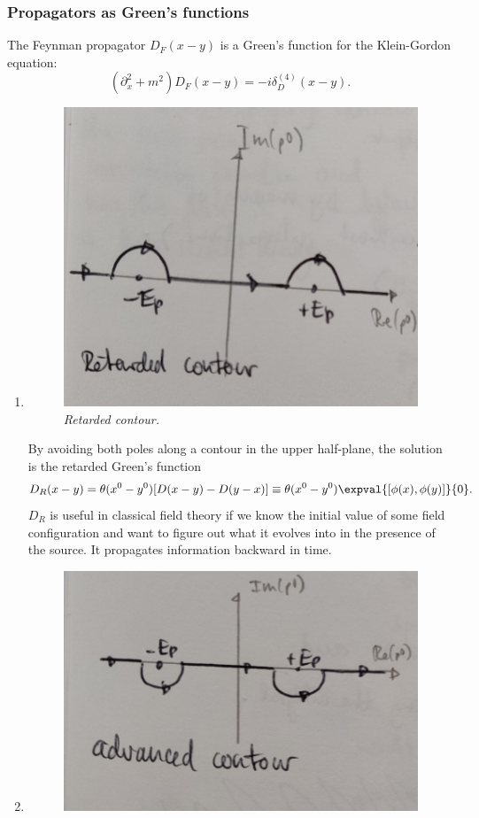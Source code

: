 \subsubsection{Propagators as Green's functions}
The Feynman propagator $D_F(x-y)$ is a Green's function for the Klein-Gordon equation:
\begin{equation}
	(\partial^2_x + m^2) D_F(x-y) = -i \delta^{(4)}_D(x-y).
\end{equation}
\begin{enumerate}
		\item
		\begin{figure}[h]
			\centering
			\includegraphics[width=0.7\linewidth]{gfx/Retardedcontour}
			\caption{\itshape Retarded contour.}
			\label{fig:retardedcontour}
		\end{figure} 
	 By avoiding both poles along a contour in the upper half-plane, the solution is the retarded Green's function
		\begin{equation}
			D_R(x-y)=\theta(x^0-y^0) [D(x-y)-D(y-x)]\equiv \theta(x^0-y^0) \expval{[\phi(x),\phi(y)]}{0}.
		\end{equation}
$D_R$ is useful in classical field theory if we know the initial value of some field configuration and want to figure out what it evolves into in the presence of the source.
It propagates information backward in time.
\item 
\begin{figure}[h]
	\centering
	\includegraphics[width=0.7\linewidth]{gfx/Advancedcontour}

\end{figure}
\end{enumerate}
